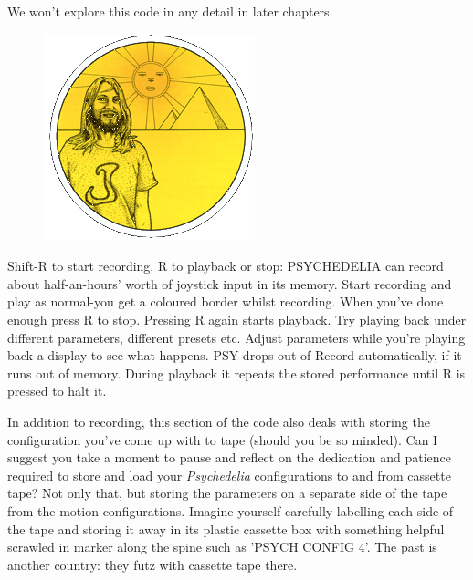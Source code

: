 We won't explore this code in any detail in later chapters. 
\begin{definition}
\setlength{\intextsep}{0pt}%
\setlength{\columnsep}{3pt}%
\begin{figure}
\includegraphics[width=\linewidth]{src/callout/psych.png} 
\end{figure}
\small
Shift-R to start recording, R to
playback or stop: PSYCHEDELIA can record about half-an-hours’
worth of joystick input in its memory. Start recording and play as
normal-you get a coloured border whilst recording. When you've
done enough press R to stop. Pressing R again starts playback. Try
playing back under different parameters, different presets etc.
Adjust parameters while you're playing back a display to see what
happens. PSY drops out of Record automatically, if it runs out of
memory. During playback it repeats the stored performance until R
is pressed to halt it.
\end{definition}

In addition to recording, this section of the code also deals with storing the configuration
you've come up with to tape (should you be so minded). Can I suggest you take a moment to pause
and reflect on the dedication and patience required to store and load your \textit{Psychedelia} configurations to and from
cassette tape? Not only that, but storing the parameters on a separate side of the tape from the motion configurations.
Imagine yourself carefully labelling each side of the tape and storing it away in its plastic cassette box with something
helpful scrawled in marker along the spine such as 'PSYCH CONFIG 4'. The past is another country: they futz with 
cassette tape there.

